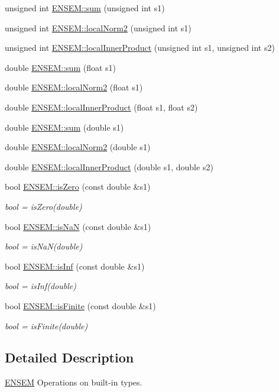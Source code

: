 \begin{DoxyCompactItemize}
unsigned int \mbox{\hyperlink{group__simpleword_ga935361714bfaafc123769fd11a4c1e85}{E\+N\+S\+E\+M\+::sum}} (unsigned int s1)
\item 
unsigned int \mbox{\hyperlink{group__simpleword_ga7ccc2671554c8711749195fe90772565}{E\+N\+S\+E\+M\+::local\+Norm2}} (unsigned int s1)
\item 
unsigned int \mbox{\hyperlink{group__simpleword_gacfa602b05feec2ea8f20fa767834c049}{E\+N\+S\+E\+M\+::local\+Inner\+Product}} (unsigned int s1, unsigned int s2)
\item 
double \mbox{\hyperlink{group__simpleword_gabcfac0639bfa76f82af16345860b6de9}{E\+N\+S\+E\+M\+::sum}} (float s1)
\item 
double \mbox{\hyperlink{group__simpleword_gaf236f47bd2b5cd9a61a0c11732c85624}{E\+N\+S\+E\+M\+::local\+Norm2}} (float s1)
\item 
double \mbox{\hyperlink{group__simpleword_ga29c49899c1c008855b6de7e6eb937893}{E\+N\+S\+E\+M\+::local\+Inner\+Product}} (float s1, float s2)
\item 
double \mbox{\hyperlink{group__simpleword_ga1c90ffe9d470fcf3fa16425a40f8fe79}{E\+N\+S\+E\+M\+::sum}} (double s1)
\item 
double \mbox{\hyperlink{group__simpleword_ga439dd5edaf993eb5a6cc2c943b3b7f55}{E\+N\+S\+E\+M\+::local\+Norm2}} (double s1)
\item 
double \mbox{\hyperlink{group__simpleword_gab6f623d6de3ec5cfdd1bdd30d067b64d}{E\+N\+S\+E\+M\+::local\+Inner\+Product}} (double s1, double s2)
\item 
bool \mbox{\hyperlink{group__simpleword_ga4696caf7dc1e9600520fb4255cc74d92}{E\+N\+S\+E\+M\+::is\+Zero}} (const double \&s1)
\begin{DoxyCompactList}\small\item\em bool = is\+Zero(double) \end{DoxyCompactList}\item 
bool \mbox{\hyperlink{group__simpleword_gaa7a998c5bfdb665a4e386ccc415407bd}{E\+N\+S\+E\+M\+::is\+NaN}} (const double \&s1)
\begin{DoxyCompactList}\small\item\em bool = is\+Na\+N(double) \end{DoxyCompactList}\item 
bool \mbox{\hyperlink{group__simpleword_ga915c6e8e5b5de2ebf1b3a8e57f95bf2f}{E\+N\+S\+E\+M\+::is\+Inf}} (const double \&s1)
\begin{DoxyCompactList}\small\item\em bool = is\+Inf(double) \end{DoxyCompactList}\item 
bool \mbox{\hyperlink{group__simpleword_ga9bc1e56e3c76d5eb1575eb3eed62ea40}{E\+N\+S\+E\+M\+::is\+Finite}} (const double \&s1)
\begin{DoxyCompactList}\small\item\em bool = is\+Finite(double) \end{DoxyCompactList}\end{DoxyCompactItemize}


\subsection{Detailed Description}
\mbox{\hyperlink{namespaceENSEM}{E\+N\+S\+EM}} Operations on built-\/in types. 

